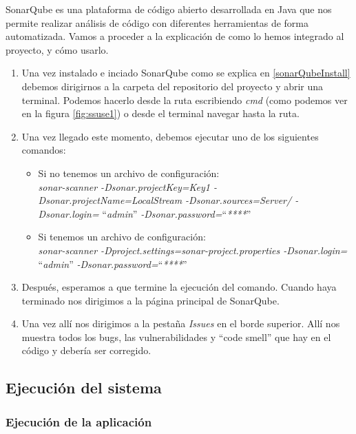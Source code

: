 SonarQube es una plataforma de código abierto desarrollada en Java que nos permite realizar análisis de código con diferentes herramientas de forma automatizada.
Vamos a proceder a la explicación de como lo hemos integrado al proyecto, y cómo usarlo.\\
\begin{enumerate}
\item
	Una vez instalado e inciado SonarQube como se explica en \ref{sonarQubeInstall} debemos dirigirnos a la carpeta del repositorio del proyecto y abrir una terminal. 
	Podemos hacerlo desde la ruta escribiendo \textit{cmd} (como podemos ver en la figura \ref{fig:ssuse1}) o desde el terminal navegar hasta la ruta.
\item 
	Una vez llegado este momento, debemos ejecutar uno de los siguientes comandos:
	\begin{itemize}
	\item
		Si no tenemos un archivo de configuración:\\
		\textit{sonar-scanner -Dsonar.projectKey=Key1 -Dsonar.projectName=LocalStream -Dsonar.sources=Server/ -Dsonar.login=} ``\textit{admin}'' \textit{-Dsonar.password=}``\textit{****}''
	\item
	Si tenemos un archivo de configuración:\\
		\textit{sonar-scanner -Dproject.settings=sonar-project.properties -Dsonar.login=} ``\textit{admin}'' \textit{-Dsonar.password=}``\textit{****}''
	\end{itemize}
\item
	Después, esperamos a que termine la ejecución del comando. Cuando haya terminado nos dirigimos a la página principal de SonarQube. 
\item
	Una vez allí nos dirigimos a la pestaña \textit{Issues} en el borde superior. Allí nos muestra todos los bugs, las vulnerabilidades y ``code smell'' que hay en el código y debería ser corregido. 
\end{enumerate}

\subsection{Ejecución del sistema}

\subsubsection{Ejecución de la aplicación}

